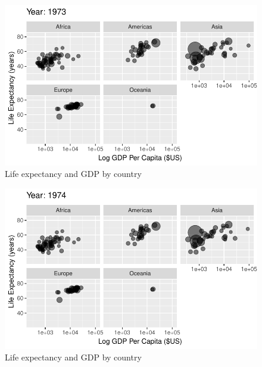 \documentclass[
  letterpaper,
  DIV=11,
  numbers=noendperiod]{scrreport}
\theoremstyle{definition}
\theoremstyle{remark}
\begin{document}
\begin{figure}

{\centering \includegraphics{index_files/figure-pdf/fig-anim-lifegdp-39.pdf}

}

\caption{\label{fig-anim-lifegdp-39}Life expectancy and GDP by country}

\end{figure}

\begin{figure}

{\centering \includegraphics{index_files/figure-pdf/fig-anim-lifegdp-40.pdf}

}

\caption{\label{fig-anim-lifegdp-40}Life expectancy and GDP by country}

\end{figure}
\end{document}
